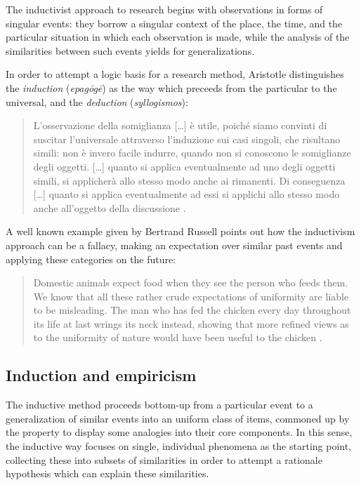 \documentclass[
  a4paper,
  twoside,
  12pt,
  chapterprefix=false,
  bibliography=totocnumbered,
  listof=flat]{scrbook}
\begin{document}
The inductivist approach to research begins with observations in forms of singular events: they borrow a singular context of the place, the time, and the particular situation in which each observation is made, while the analysis of the similarities between such events yields for generalizations.

In order to attempt a logic basis for a research method, Aristotle distinguishes the \emph{induction} (\emph{epagōgē}) as the way which preceeds from the particular to the universal, and the \emph{deduction} (\emph{syllogismos}):

\begin{quote}
L'osservazione della somiglianza {[}\ldots{]} è utile, poiché siamo convinti di suscitar l'universale attraverso l'induzione sui casi singoli, che risultano simili: non è invero facile indurre, quando non si conoscono le somiglianze degli oggetti. {[}\ldots{]} quanto si applica eventualmente ad uno degli oggetti simili, si applicherà allo stesso modo anche ai rimanenti. Di conseguenza {[}\ldots{]} quanto si applica eventualmente ad essi si applichi allo stesso modo anche all'oggetto della discussione \citep[ \emph{Topici} 1.18.108b]{aristoteleOrganon}.
\end{quote}

A well known example given by Bertrand Russell points out how the inductivism approach can be a fallacy, making an expectation over similar past events and applying these categories on the future:

\begin{quote}
Domestic animals expect food when they see the person who feeds them. We know that all these rather crude expectations of uniformity are liable to be misleading. The man who has fed the chicken every day throughout its life at last wrings its neck instead, showing that more refined views as to the uniformity of nature would have been useful to the chicken \citep{russellProblems}.
\end{quote}

\hypertarget{induction-and-empiricism}{%
\subsection{Induction and empiricism}\label{induction-and-empiricism}}

The inductive method proceeds bottom-up from a particular event to a generalization of similar events into an uniform class of items, commoned up by the property to display some analogies into their core components. In this sense, the inductive way focuses on single, individual phenomena as the starting point, collecting these into subsets of similarities in order to attempt a rationale hypothesis which can explain these similarities.
\end{document}
